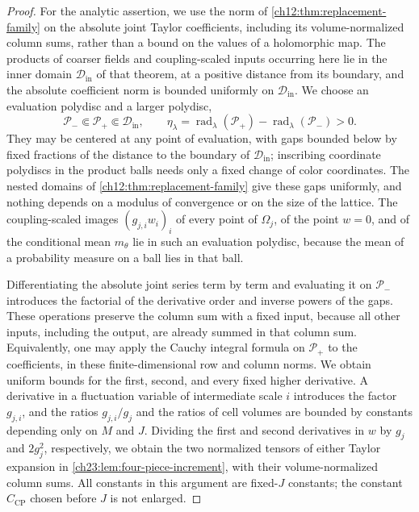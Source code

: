 \begin{proof}
For the analytic assertion, we use the norm of \cref{ch12:thm:replacement-family} on the absolute joint Taylor coefficients, including its volume-normalized column sums, rather than a bound on the values of a holomorphic map. The products of coarser fields and coupling-scaled inputs occurring here lie in the inner domain $\mathscr D_{\mathrm{in}}$ of that theorem, at a positive distance from its boundary, and the absolute coefficient norm is bounded uniformly on $\mathscr D_{\mathrm{in}}$. We choose an evaluation polydisc and a larger polydisc,
\[
 \mathscr P_-\Subset\mathscr P_+\Subset\mathscr D_{\mathrm{in}},
 \qquad \eta_\lambda=\operatorname{rad}_\lambda(\mathscr P_+)-\operatorname{rad}_\lambda(\mathscr P_-)>0.
\]
They may be centered at any point of evaluation, with gaps bounded below by fixed fractions of the distance to the boundary of $\mathscr D_{\mathrm{in}}$; inscribing coordinate polydiscs in the product balls needs only a fixed change of color coordinates. The nested domains of \cref{ch12:thm:replacement-family} give these gaps uniformly, and nothing depends on a modulus of convergence or on the size of the lattice. The coupling-scaled images $(g_{j,i}w_i)_i$ of every point of $\Omega_j$, of the point $w=0$, and of the conditional mean $m_\theta$ lie in such an evaluation polydisc, because the mean of a probability measure on a ball lies in that ball.

Differentiating the absolute joint series term by term and evaluating it on $\mathscr P_-$ introduces the factorial of the derivative order and inverse powers of the gaps. These operations preserve the column sum with a fixed input, because all other inputs, including the output, are already summed in that column sum. Equivalently, one may apply the Cauchy integral formula on $\mathscr P_+$ to the coefficients, in these finite-dimensional row and column norms. We obtain uniform bounds for the first, second, and every fixed higher derivative. A derivative in a fluctuation variable of intermediate scale $i$ introduces the factor $g_{j,i}$, and the ratios $g_{j,i}/g_j$ and the ratios of cell volumes are bounded by constants depending only on $M$ and $J$. Dividing the first and second derivatives in $w$ by $g_j$ and $2g_j^2$, respectively, we obtain the two normalized tensors of either Taylor expansion in \cref{ch23:lem:four-piece-increment}, with their volume-normalized column sums. All constants in this argument are fixed-$J$ constants; the constant $C_{\mathrm{CP}}$ chosen before $J$ is not enlarged.
\end{proof}

